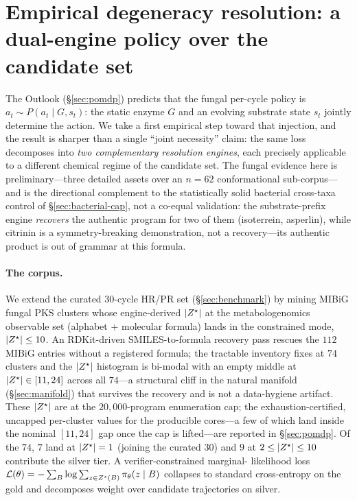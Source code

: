 \section{Empirical degeneracy resolution: a dual-engine policy over the candidate set}
\label{sec:structural-rescue}

The Outlook (\S\ref{sec:pomdp}) predicts that the fungal per-cycle policy is
\(a_t \sim P(a_t \mid G, s_t)\): the static enzyme \(G\) and an evolving substrate state
\(s_t\) jointly determine the action. We take a first empirical step toward that
injection, and the result is sharper than a single ``joint necessity'' claim: the same
loss decomposes into \emph{two complementary resolution engines}, each precisely
applicable to a different chemical regime of the candidate set. The fungal evidence here is
preliminary---three detailed assets over an $n{=}62$ conformational sub-corpus---and is the directional
complement to the statistically solid bacterial cross-taxa control of \S\ref{sec:bacterial-cap}, not a
co-equal validation: the substrate-prefix engine \emph{recovers} the authentic program for two of them
(isoterrein, asperlin), while citrinin is a symmetry-breaking demonstration, not a recovery---its
authentic product is out of grammar at this formula.

\paragraph{The corpus.} We extend the curated $30$-cycle HR/PR set (\S\ref{sec:benchmark})
by mining MIBiG fungal PKS clusters whose engine-derived $|Z^{\star}|$ at the
metabologenomics observable set (alphabet $+$ molecular formula) lands in the
constrained mode, $|Z^{\star}|\le 10$. An RDKit-driven SMILES-to-formula recovery pass
rescues the $112$ MIBiG entries without a registered formula; the tractable inventory
fixes at $74$ clusters and the $|Z^{\star}|$ histogram is bi-modal with an empty middle at
$|Z^{\star}|\in[11,24]$ across all $74$---a structural cliff in the natural manifold
(\S\ref{sec:manifold}) that survives the recovery and is not a data-hygiene artifact. These
$|Z^{\star}|$ are at the $20{,}000$-program enumeration cap; the exhaustion-certified, uncapped
per-cluster values for the producible cores---a few of which land inside the nominal
$[11,24]$ gap once the cap is lifted---are reported in \S\ref{sec:pomdp}.
Of the $74$, $7$ land at $|Z^{\star}|=1$ (joining the curated $30$) and $9$ at
$2\le|Z^{\star}|\le 10$ contribute the silver tier. A verifier-constrained marginal-
likelihood loss \(\mathcal{L}(\theta)= -\sum_B \log \sum_{z\in Z^{\star}(B)} \pi_\theta(z\mid B)\)
collapses to standard cross-entropy on the gold and decomposes weight over candidate
trajectories on silver.

